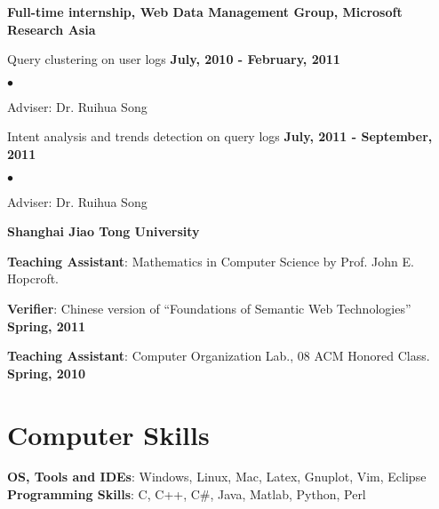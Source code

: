 \documentclass[margin,line]{res}
\newenvironment{list1}{
  \begin{list}{\ding{113}}{%
      \setlength{\itemsep}{0in}
      \setlength{\parsep}{0in} \setlength{\parskip}{0in}
      \setlength{\topsep}{0in} \setlength{\partopsep}{0in} 
      \setlength{\leftmargin}{0.17in}}}{\end{list}}
\newenvironment{list2}{
  \begin{list}{$\bullet$}{%
      \setlength{\itemsep}{0in}
      \setlength{\parsep}{0in} \setlength{\parskip}{0in}
      \setlength{\topsep}{0in} \setlength{\partopsep}{0in} 
      \setlength{\leftmargin}{0.2in}}}{\end{list}}
\begin{document}
\begin{resume}
{\bf Full-time internship, Web Data Management Group, Microsoft Research Asia}
\vspace*{0.1in}
\begin{list1}
\item[] Query clustering on user logs \hfill {\bf July, 2010 - February, 2011}\\
\vspace*{-.1in}
\begin{list2}
\item Adviser: Dr. Ruihua Song
\end{list2}
\vspace*{0.1in}
\item[] Intent analysis and trends detection on query logs \hfill {\bf July, 2011 - September, 2011}\\
\vspace*{-.1in}
\begin{list2}
\item  Adviser: Dr. Ruihua Song
\end{list2}
\end{list1}
{\bf Shanghai Jiao Tong University}
\begin{list1}
\item[] {\bf Teaching Assistant}: Mathematics in Computer Science by Prof. John E. Hopcroft.\\
\item[] {\bf Verifier}: Chinese version of ``Foundations of Semantic Web Technologies'' \hfill {\bf Spring, 2011}\\
\item[] {\bf Teaching Assistant}: Computer Organization Lab., 08 ACM Honored Class. \hfill {\bf Spring, 2010}\\
\end{list1}

\section{\sc Computer Skills} 
{\bf OS, Tools and IDEs}: Windows, Linux, Mac, Latex, Gnuplot, Vim, Eclipse\\
{\bf Programming Skills}: C, C++, C\#, Java, Matlab, Python, Perl

\end{resume}
\end{document}
